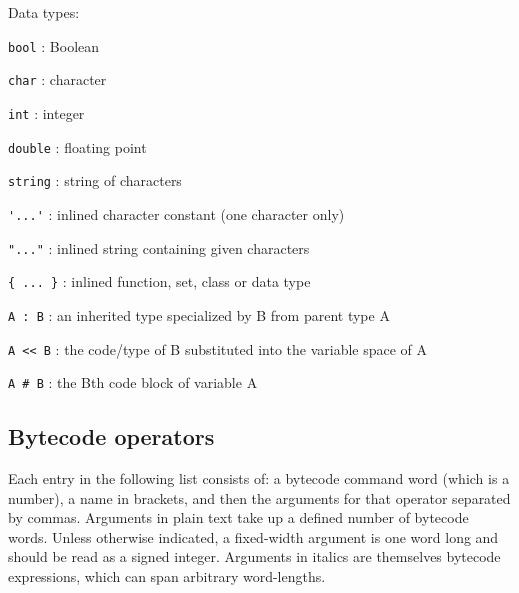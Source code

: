 \documentclass{article}
\begin{document}
\noindent
Data types:
\begin{description}
\item{\verb#bool#} :  Boolean
\item{\verb#char#} :  character
\item{\verb#int#} :  integer
\item{\verb#double#} :  floating point
\item{\verb#string#} :  string of characters
\item{\verb#'...'#} :  inlined character constant (one character only)
\item{\verb#"..."#} :  inlined string containing given characters
\item{\verb#{ ... }#} :  inlined function, set, class or data type
\item{\verb#A : B#} :  an inherited type specialized by B from parent type A
\item{\verb#A << B#} :  the code/type of B substituted into the variable space of A
\item{\verb$A # B$} :  the Bth code block of variable A\\
\end{description}

 

\normalsize







\subsection{Bytecode operators}  

Each entry in the following list consists of:  a bytecode command word (which is a number), a name in brackets, and then the arguments for that operator separated by commas.  Arguments in plain text take up a defined number of bytecode words.  Unless otherwise indicated, a fixed-width argument is one word long and should be read as a signed integer.  Arguments in italics are themselves bytecode expressions, which can span arbitrary word-lengths.\\
\end{document}
